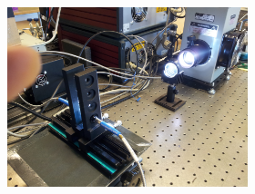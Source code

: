 \documentclass[draft,webedition,openright,titles,swedish,english]{LuaUUThesis}\usepackage[]{graphicx}\usepackage[]{xcolor}
\begin{document}
\begin{figure}[tbp]
\begin{subfigure}[T]{0.32\textwidth}
\begin{subfigure}{\linewidth}
      \caption{}
      \label{fig:0400-pc-solarsimulator-thinfilm}
   \end{subfigure}%
   \\[3.70pt]%
   \begin{subfigure}{\linewidth}
      \includegraphics[trim={160mm 80mm 0 60mm},clip,width=\linewidth]{methods/photocatalysis/0424130001.jpg}
      \caption{}

\end{subfigure}
\end{subfigure}
\end{figure}
\end{document}
